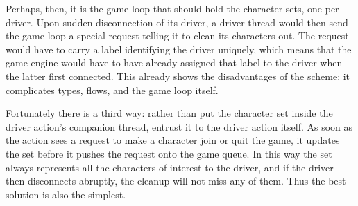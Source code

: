Perhaps, then, it is the game loop that should hold the character sets,
one per driver.
Upon sudden disconnection of its driver, a driver thread would then send the
game loop a special request telling it to clean its characters out.
The request would have to carry a label identifying the driver uniquely,
which means that the game engine would have to have already assigned that label
to the driver when the latter first connected.
This already shows the disadvantages of the scheme: it complicates types,
flows, and the game loop itself.

Fortunately there is a third way: rather than put the character set inside the
driver action's companion thread, entrust it to the driver action itself.
As soon as the action sees a request to make a character join or quit the game,
it updates the set before it pushes the request onto the game queue.
In this way the set always represents all the characters of interest to the
driver, and if the driver then disconnects abruptly, the cleanup will not
miss any of them.
Thus the best solution is also the simplest.
